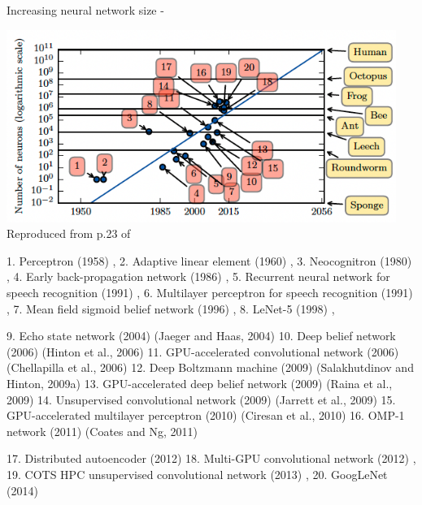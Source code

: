 \begin{frame}[t,allowframebreaks]{Increasing neural network size - }
    \begin{center}
        \includegraphics[width=0.95\textwidth]
           {./images/dl_intro/nnet_size_neurons_vs_time_01.png}\\
        {\scriptsize \color{col:attribution} 
        Reproduced from p.23 of \cite{Goodfellow:2017DL}}\\
    \end{center}
       {\tiny
       1. Perceptron (1958) \cite{Rosenblatt:1958p},
       2. Adaptive linear element (1960) \cite{Widrow:1960as},
       3. Neocognitron (1980) \cite{Fukushima:1980nc},
       4. Early back-propagation network (1986) \cite{Rumelhart:1986erp},
       5. Recurrent neural network for speech recognition (1991) \cite{Robinson:1991rerp},
       6. Multilayer perceptron for speech recognition (1991) \cite{Bengio:1991pma},
       7. Mean field sigmoid belief network (1996) \cite{Saul:1996mf},
       8. LeNet-5 (1998) \cite{LeCun:1998ln5},

       9. Echo state network (2004) (Jaeger and Haas, 2004)
       10. Deep belief network (2006) (Hinton et al., 2006)
       11. GPU-accelerated convolutional network (2006) (Chellapilla et al., 2006)
       12. Deep Boltzmann machine (2009) (Salakhutdinov and Hinton, 2009a)
       13. GPU-accelerated deep belief network (2009) (Raina et al., 2009)
       14. Unsupervised convolutional network (2009) (Jarrett et al., 2009)
       15. GPU-accelerated multilayer perceptron (2010) (Ciresan et al., 2010)
       16. OMP-1 network (2011) (Coates and Ng, 2011)
       
       17. Distributed autoencoder (2012) \cite{Le:2012daut}
       18. Multi-GPU convolutional network (2012) \cite{Krizhevsky:2012img},
       19. COTS HPC unsupervised convolutional network (2013) \cite{Coates:2013cots},       
       20. GoogLeNet (2014) \cite{Szegedy:2014gnet}\\
       }


\end{frame}
